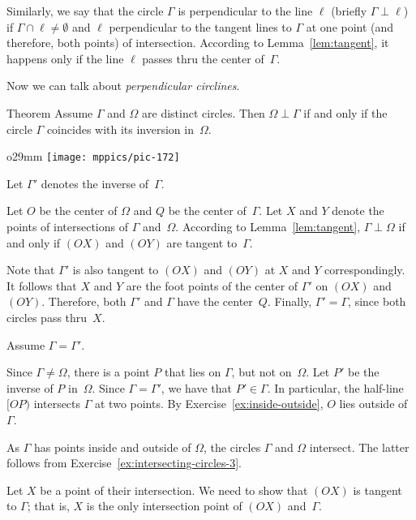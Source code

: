 Similarly, we say that the circle $\Gamma$ is perpendicular to the line $\ell$ (briefly $\Gamma\perp \ell$)
if $\Gamma\cap\ell\ne \emptyset$ and $\ell$ perpendicular to the tangent lines to $\Gamma$ at one point (and therefore, both points) of intersection.
According to Lemma~\ref{lem:tangent}, 
it happens only if the line $\ell$ passes thru the center of~$\Gamma$.

Now we can talk about \emph{perpendicular circlines}.

\begin{thm}{Theorem}\label{thm:perp-inverse}
Assume $\Gamma$ and $\Omega$ are distinct circles. 
Then $\Omega\perp\Gamma$ if and only if the circle $\Gamma$ coincides with its inversion in~$\Omega$.
\end{thm}

\begin{wrapfigure}[7]{o}{29mm}
\vskip-4mm
\centering
\texttt{[image: mppics/pic-172]}
\end{wrapfigure}

Let $\Gamma'$ denotes the inverse of~$\Gamma$.

Let $O$ be the center of $\Omega$
and $Q$ be the center of~$\Gamma$.
Let $X$ and $Y$ denote the points of intersections of  $\Gamma$ and~$\Omega$.
According to Lemma~\ref{lem:tangent}, $\Gamma\perp\Omega$ if and only if $(OX)$ and $(OY)$ are tangent to~$\Gamma$.

Note that $\Gamma'$ is also tangent to $(OX)$ and $(OY)$ at $X$ and $Y$ correspondingly. 
It follows that $X$ and $Y$ are the foot points of the center of $\Gamma'$ on $(OX)$ and $(OY)$.
Therefore, both $\Gamma'$ and $\Gamma$ have the center~$Q$.
Finally, $\Gamma'=\Gamma$, since both circles pass thru~$X$.

Assume $\Gamma=\Gamma'$.

Since $\Gamma\ne \Omega$, there is a point $P$ that lies on $\Gamma$, but not on~$\Omega$.
Let $P'$ be the inverse of $P$ in~$\Omega$.
Since $\Gamma=\Gamma'$, we have that $P'\in \Gamma$.
In particular, the half-line $[OP)$ intersects $\Gamma$ at two points.
By Exercise~\ref{ex:inside-outside}, 
 $O$ lies outside of~$\Gamma$.

As $\Gamma$ has points inside and outside of $\Omega$,
the circles $\Gamma$ and $\Omega$ intersect.
The latter follows from Exercise~\ref{ex:intersecting-circles-3}.

Let $X$ be a point of their intersection.
We need to show that $(OX)$ is tangent to $\Gamma$;
that is, $X$ is the only intersection point of $(OX)$ and~$\Gamma$.

